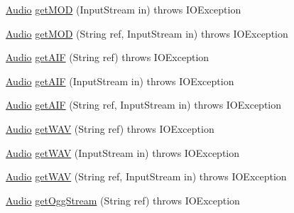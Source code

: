 \begin{DoxyCompactItemize}
\item 
\mbox{\hyperlink{interfaceorg_1_1newdawn_1_1slick_1_1openal_1_1_audio}{Audio}} \mbox{\hyperlink{classorg_1_1newdawn_1_1slick_1_1openal_1_1_sound_store_a8fb8e317d1309a9390b256531032820e}{get\+M\+OD}} (Input\+Stream in)  throws I\+O\+Exception 
\item 
\mbox{\hyperlink{interfaceorg_1_1newdawn_1_1slick_1_1openal_1_1_audio}{Audio}} \mbox{\hyperlink{classorg_1_1newdawn_1_1slick_1_1openal_1_1_sound_store_aeabf139bfb917fda7b01bdf2691ae3e9}{get\+M\+OD}} (String ref, Input\+Stream in)  throws I\+O\+Exception 
\item 
\mbox{\hyperlink{interfaceorg_1_1newdawn_1_1slick_1_1openal_1_1_audio}{Audio}} \mbox{\hyperlink{classorg_1_1newdawn_1_1slick_1_1openal_1_1_sound_store_a1184883b7fdecc6504664956545dfad7}{get\+A\+IF}} (String ref)  throws I\+O\+Exception 
\item 
\mbox{\hyperlink{interfaceorg_1_1newdawn_1_1slick_1_1openal_1_1_audio}{Audio}} \mbox{\hyperlink{classorg_1_1newdawn_1_1slick_1_1openal_1_1_sound_store_a1228fb419583822621cf737c9ed9b52f}{get\+A\+IF}} (Input\+Stream in)  throws I\+O\+Exception 
\item 
\mbox{\hyperlink{interfaceorg_1_1newdawn_1_1slick_1_1openal_1_1_audio}{Audio}} \mbox{\hyperlink{classorg_1_1newdawn_1_1slick_1_1openal_1_1_sound_store_a2f9a4a54273f139d6064245bf506ac9c}{get\+A\+IF}} (String ref, Input\+Stream in)  throws I\+O\+Exception 
\item 
\mbox{\hyperlink{interfaceorg_1_1newdawn_1_1slick_1_1openal_1_1_audio}{Audio}} \mbox{\hyperlink{classorg_1_1newdawn_1_1slick_1_1openal_1_1_sound_store_a7ebe093db6c98d29e5673158d0ac4191}{get\+W\+AV}} (String ref)  throws I\+O\+Exception 
\item 
\mbox{\hyperlink{interfaceorg_1_1newdawn_1_1slick_1_1openal_1_1_audio}{Audio}} \mbox{\hyperlink{classorg_1_1newdawn_1_1slick_1_1openal_1_1_sound_store_a9921804be6cb949ffd501f22100c0b30}{get\+W\+AV}} (Input\+Stream in)  throws I\+O\+Exception 
\item 
\mbox{\hyperlink{interfaceorg_1_1newdawn_1_1slick_1_1openal_1_1_audio}{Audio}} \mbox{\hyperlink{classorg_1_1newdawn_1_1slick_1_1openal_1_1_sound_store_a9dcbc7bdb787e925ed0ef068fa721a74}{get\+W\+AV}} (String ref, Input\+Stream in)  throws I\+O\+Exception 
\item 
\mbox{\hyperlink{interfaceorg_1_1newdawn_1_1slick_1_1openal_1_1_audio}{Audio}} \mbox{\hyperlink{classorg_1_1newdawn_1_1slick_1_1openal_1_1_sound_store_af99b33a4a137e1b51e3202b6fb5b02ea}{get\+Ogg\+Stream}} (String ref)  throws I\+O\+Exception 

\end{DoxyCompactItemize}
